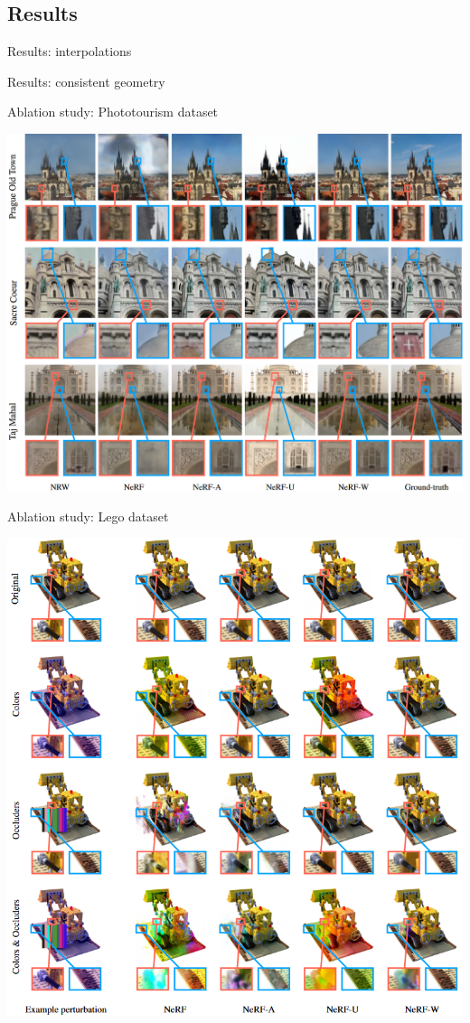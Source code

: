 \documentclass[aspectratio=1610]{beamer}
\begin{document}
\subsection{Results}
\begin{frame}{Results: interpolations}
    \begin{figure}[H]
    \end{figure}
\end{frame}
\begin{frame}{Results: consistent geometry}
    \begin{figure}[H]
    \end{figure}
\end{frame}
\begin{frame}{Ablation study: Phototourism dataset}
    \begin{center}
        \includegraphics[width=.69\textwidth]{res-photo.png}
    \end{center}
\end{frame}
\begin{frame}{Ablation study: Lego dataset}
    \begin{center}
        \includegraphics[width=.51\textwidth]{results-lego.png}
    \end{center}
\end{frame}
\end{document}

